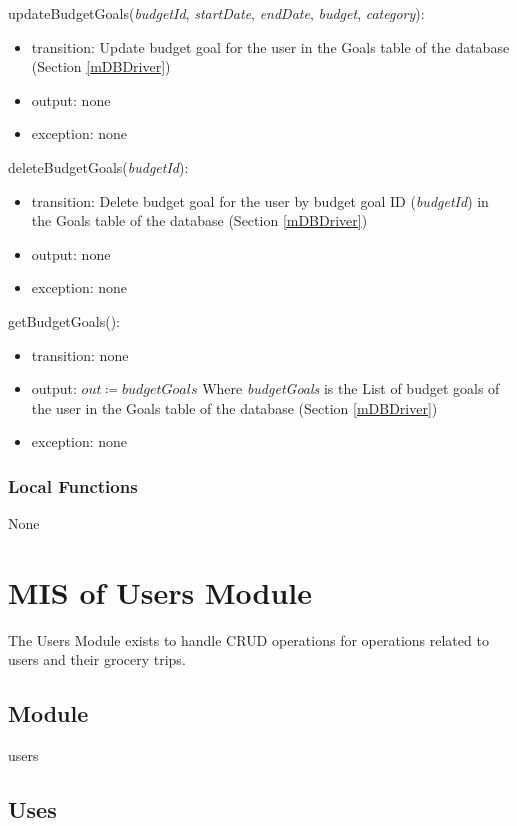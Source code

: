 \documentclass[12pt, titlepage]{article}
\begin{document}
\noindent updateBudgetGoals(\textit{budgetId}, \textit{startDate}, \textit{endDate}, \textit{budget}, \textit{category}):
\begin{itemize}
\item transition: Update budget goal for the user in the Goals table of the database (Section \ref{mDBDriver})
\item output: none
\item exception: none
\end{itemize}

\noindent deleteBudgetGoals(\textit{budgetId}):
\begin{itemize}
\item transition: Delete budget goal for the user by budget goal ID (\textit{budgetId}) in the Goals table of the database (Section \ref{mDBDriver})
\item output: none
\item exception: none
\end{itemize}

\noindent getBudgetGoals():
\begin{itemize}
\item transition: none
\item output: \( \textit{out} \coloneqq budgetGoals \) Where \textit{budgetGoals} is the List of budget goals of the user in the Goals table of the database (Section \ref{mDBDriver})
\item exception: none
\end{itemize}


\subsubsection{Local Functions}
None

\newpage

\section{MIS of Users Module} \label{mUsers} 
The Users Module exists to handle CRUD operations for operations related to users and their grocery trips.

\subsection{Module}

users

\subsection{Uses}
\end{document}
